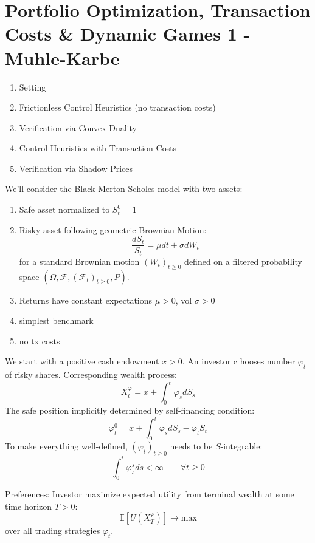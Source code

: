 \documentclass[twocolumn,openany]{book}
\begin{document}
\chapter{Portfolio Optimization, Transaction Costs \& Dynamic Games 1 - Muhle-Karbe}
\begin{enumerate}
	\item Setting
	\item Frictionless Control Heuristics (no transaction costs)
	\item Verification via Convex Duality
	\item Control Heuristics with Transaction Costs
	\item Verification via Shadow Prices
\end{enumerate}

We'll consider the Black-Merton-Scholes model with two assets:
\begin{enumerate}
	\item Safe asset normalized to $S^0_t=1$
	\item Risky asset following geometric Brownian Motion:
	\begin{equation}
		\frac{dS_t}{S_t} = \mu dt + \sigma dW_t
	\end{equation}
	for a standard Brownian motion $(W_t)_{t\geq 0}$ defined on a filtered probability space $(\Omega, \mathcal{F}, (\mathcal{F}_t)_{t\geq 0}, P)$.
	\item Returns have constant expectations $\mu > 0$, vol $\sigma >0$
	\item simplest benchmark
	\item no tx costs
\end{enumerate}

We start with a positive cash endowment $x > 0$. An investor c hooses number $\varphi_t$ of risky shares. Corresponding wealth process:
\begin{equation}
	X_t^{\varphi} = x + \int_0^t \varphi_s dS_s
\end{equation}
The safe position implicitly determined by self-financing condition:
\begin{equation}
	\varphi_t^0 = x + \int_0^t \varphi_s dS_s - \varphi_t S_t
\end{equation}
To make everything well-defined, $(\varphi_t)_{t\geq 0}$ needs to be $S$-integrable:
\begin{equation}
	\int_0^t \varphi_s^s ds < \infty \qquad \forall t \geq 0
\end{equation}

Preferences: Investor maximize expected utility from terminal wealth at some time horizon $T>0$:
\begin{equation}
	\mathbb{E}\left[ U(X^\varphi_T) \right] \to \text{max}
\end{equation}
over all trading strategies $\varphi_t$.
\end{document}
